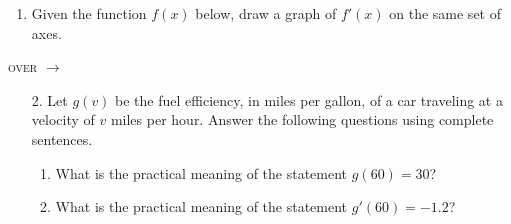 \documentclass[11pt]{article}
\begin{document}
\pagestyle{empty}
\newsavebox{\quizfront}
\begin{lrbox}{\quizfront}
\begin{minipage}[top][4.5in][t]{\textwidth} \setlength{\parindent}{1.5em}
\drawtitle
\vspace{-0.5in}
\begin{enumerate}

\item Given the function $f(x)$ below, draw a graph of $f'(x)$ on the
  same set of axes.

  \vfill
  
  \begin{center}
  \end{center}
  \vfill

\end{enumerate}

\hfill \textsc{over} $\longrightarrow$

\end{minipage}
\end{lrbox}

\newsavebox{\quizback}
\begin{lrbox}{\quizback}
\begin{minipage}[top][4.5in][t]{\textwidth} \setlength{\parindent}{1.5em}
\begin{enumerate}
\item[2.] Let $g(v)$ be the fuel efficiency, in miles per gallon, of a car
  traveling at a velocity of $v$ miles per hour. Answer the following
  questions using complete sentences.
  \begin{enumerate}
  \item What is the practical meaning of the statement $g(60) = 30$?

    \vfill
    
  \item What is the practical meaning of the statement $g'(60) = -1.2$?

    \vfill
    
  \end{enumerate}
\end{enumerate}
\end{minipage}
\end{lrbox}

\noindent \usebox{\quizfront}
\vfill
\noindent \usebox{\quizfront}

\pagebreak
\noindent \usebox{\quizback}
\vfill
\noindent \usebox{\quizback}
\end{document}
